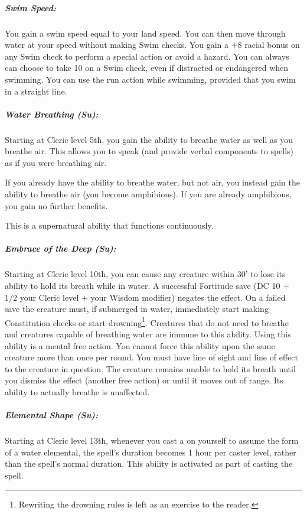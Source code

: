 \subparagraph{Swim Speed:}
You gain a swim speed equal to your land speed.
You can then move through water at your speed without making Swim checks.
You gain a +8 racial bonus on any Swim check to perform a special action or avoid a hazard. 
You can always can choose to take 10 on a Swim check, even if distracted or endangered when swimming. 
You can use the run action while swimming, provided that you swim in a straight line.
\subparagraph[Water Breathing]{Water Breathing (Su):}
\label{sec:WaterBreathing}
Starting at Cleric level 5th, you gain the ability to breathe water as well as you breathe air. This allows you to speak (and provide verbal components to spells) as if you were breathing air.

If you already have the ability to breathe water, but not air, you instead gain the ability to breathe air (you become amphibious). If you are already amphibious, you gain no further benefits.

This is a supernatural ability that functions continuously.
\subparagraph{Embrace of the Deep (Su):}
Starting at Cleric level 10th, you can cause any creature within 30' to lose its ability to hold its breath while in water.
A successful Fortitude save (DC 10 + $1/2$ your Cleric level + your Wisdom modifier) negates the effect.
On a failed save the creature must, if submerged in water, immediately start making Constitution checks or start drowning\footnote{Rewriting the drowning rules is left as an exercise to the reader.}.
Creatures that do not need to breathe and creatures capable of breathing water are immune to this ability.
Using this ability is a mental free action.
You cannot force this ability upon the same creature more than once per round. 
You must have line of sight and line of effect to the creature in question. 
The creature remains unable to hold its breath until you dismiss the effect (another free action) or until it moves out of range.
Its ability to actually breathe is unaffected.
\subparagraph{Elemental Shape (Su):}
Starting at Cleric level 13th, whenever you cast a  on yourself to assume the form of a water elemental, 
the spell's duration becomes 1 hour per caster level, rather than the spell's normal duration.
This ability is activated as part of casting the spell.
